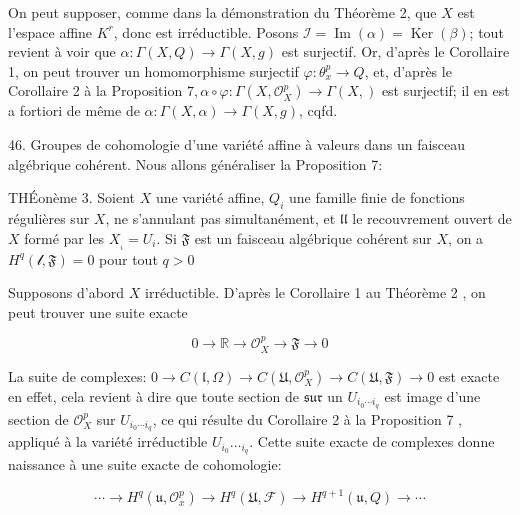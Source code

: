On peut supposer, comme dans la démonstration du Théorème 2, que $X$ est l'espace affine $K^{r}$, donc est irréductible. Posons $\mathscr{I}=\operatorname{Im}(\alpha)=\operatorname{Ker}(\beta)$; tout revient à voir que $\alpha: \Gamma(X, Q) \rightarrow \Gamma(X, g)$ est surjectif. Or, d'après le Corollaire 1, on peut trouver un homomorphisme surjectif $\varphi: \theta_{x}^{p} \rightarrow Q$, et, d'après le Corollaire 2 à la Proposition $7, \alpha \circ \varphi: \Gamma\left(X, \mathcal{O}_{X}^{p}\right) \rightarrow \Gamma(X, \mathscr{})$ est surjectif; il en est a fortiori de même de $\alpha: \Gamma(X, \alpha) \rightarrow \Gamma(X, g)$, cqfd.

46. Groupes de cohomologie d'une variété affine à valeurs dans un faisceau algébrique cohérent. Nous allons généraliser la Proposition 7:

THÉonème 3. Soient $X$ une variété affine, $Q_{i}$ une famille finie de fonctions régulières sur $X$, ne s'annulant pas simultanément, et $\mathfrak{l l}$ le recouvrement ouvert de $X$ formé par les $X_{{ }_{i}}=U_{i} .$ Si $\mathfrak{F}$ est un faisceau algébrique cohérent sur $X$, on a $H^{q}(\mathcal{l}, \mathfrak{F})=0$ pour tout $q>0$

Supposons d'abord $X$ irréductible. D'après le Corollaire 1 au Théorème 2 , on peut trouver une suite exacte

$$
0 \rightarrow \mathbb{R} \rightarrow \mathcal{O}_{X}^{p} \rightarrow \mathfrak{F} \rightarrow 0
$$

La suite de complexes: $0 \rightarrow C(\mathfrak{l}, \Omega) \rightarrow C\left(\mathfrak{U}, \mathcal{O}_{X}^{p}\right) \rightarrow C(\mathfrak{U}, \mathfrak{F}) \rightarrow 0$ est exacte en effet, cela revient à dire que toute section de $\mathfrak{s u r}$ un $U_{i_{0} \cdots i_{q}}$ est image d'une section de $\mathcal{O}_{X}^{p}$ sur $U_{i_{0} \cdots i_{q}}$, ce qui résulte du Corollaire 2 à la Proposition 7 , appliqué à la variété irréductible $U_{i_{0}} \ldots_{i_{q}} .$ Cette suite exacte de complexes donne naissance à une suite exacte de cohomologie:

$$
\cdots \rightarrow H^{q}\left(\mathfrak{u}, \mathcal{O}_{x}^{p}\right) \rightarrow H^{q}(\mathfrak{U}, \mathcal{F}) \rightarrow H^{q+1}(\mathfrak{u}, Q) \rightarrow \cdots
$$


